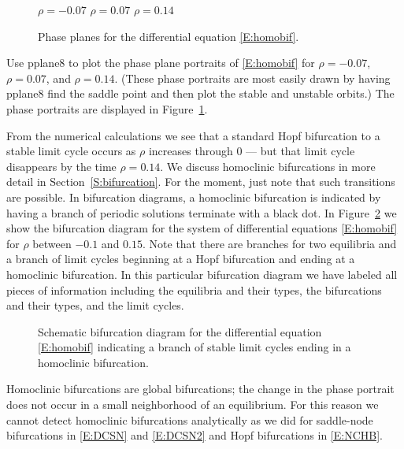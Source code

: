 \documentclass{ximera}
\begin{document}
\begin{figure}[htb]
           \centerline{%
           }
		\vspace*{-0.2in}		
	$\rho=-0.07$ \hspace{1.8in} $\rho=0.07$ 
		\hspace{1.8in} $\rho=0.14$
	  \caption{Phase planes for the differential equation 
	\protect\eqref{E:homobif}. }
           \label{F:homobif}
\end{figure}

Use {\sf pplane8} to plot the phase plane portraits of \eqref{E:homobif}
for $\rho=-0.07$, $\rho=0.07$, and $\rho=0.14$.  (These phase portraits 
are most easily drawn by having {\sf pplane8} find the saddle point and
then plot the stable and unstable orbits.)  The phase portraits are 
displayed in Figure~\ref{F:homobif}.  

From the numerical calculations we see that a standard Hopf bifurcation 
to a stable limit cycle occurs as $\rho$ 
increases through $0$ --- but that limit cycle disappears by the
time $\rho=0.14$.   We discuss homoclinic bifurcations in more detail 
in Section~\ref{S:bifurcation}.  For the moment, just note that such 
transitions are possible.  In bifurcation diagrams, a homoclinic 
bifurcation  is indicated by having a branch of periodic solutions
terminate with a black dot.  In Figure~\ref{F:homobifdiag} we show the 
bifurcation diagram for the system of differential equations 
\eqref{E:homobif} for $\rho$ between $-0.1$ and $0.15$.  Note that there
are branches for two equilibria and a 
branch of limit cycles 
beginning at a Hopf bifurcation and ending at a homoclinic bifurcation.
In this particular bifurcation diagram we have labeled all pieces
of information including the equilibria and their types, the 
bifurcations and their types, and the limit cycles.


\begin{figure}[htb]
           \centerline{%
           }
  \caption{Schematic bifurcation diagram for the differential equation
    \protect\eqref{E:homobif} indicating a branch of stable limit cycles
        ending in a homoclinic bifurcation.}
           \label{F:homobifdiag}
\end{figure}

Homoclinic bifurcations are global bifurcations; the change in the phase 
portrait does not occur in a small neighborhood of an equilibrium.  For 
this reason we cannot detect homoclinic bifurcations analytically as we 
did for saddle-node bifurcations in \eqref{E:DCSN} and \eqref{E:DCSN2} and Hopf bifurcations in \eqref{E:NCHB}.
\end{document}
